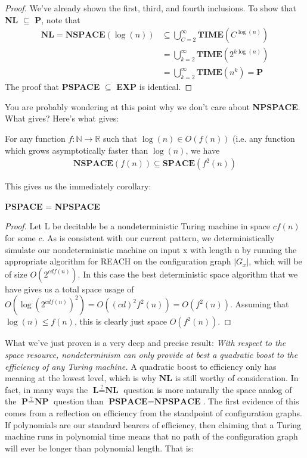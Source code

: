 \begin{proof}
We've already shown the first, third, and fourth inclusions. To show that \textbf{NL} $\subseteq$ \textbf{P}, note that
\begin{align}
	\textbf{NL} = \textbf{NSPACE}(\log(n)) &\subseteq \bigcup_{C=2}^{\infty}\textbf{TIME}(C^{\log(n)}) \\
	&= \bigcup_{k=2}^{\infty}\textbf{TIME}(2^{k\log(n)}) \\
	&= \bigcup_{k=2}^{\infty}\textbf{TIME}(n^k) = \textbf{P}
\end{align}  
The proof that \textbf{PSPACE} $\subseteq$ \textbf{EXP} is identical.  
\end{proof}
You are probably wondering at this point why we don't care about \textbf{NPSPACE}. What gives? Here's what gives:
\begin{theorem} For any function $f:\mathbb{N} \to \mathbb{R}$ such that $\log(n) \in O(f(n))$ (i.e. any function which grows asymptotically faster than $\log(n)$, we have
\begin{align}
    \textbf{NSPACE$(f(n))$} \subseteq \textbf{SPACE$(f^2(n))$}
\end{align}
\end{theorem}
This gives us the immediately corollary:
\begin{corollary}
\textbf{PSPACE} = \textbf{NPSPACE} 
\end{corollary}
\begin{proof}
Let L be decitable be a nondeterministic Turing machine in space $cf(n)$ for some $c$. As is consistent with our current pattern, we deterministically simulate our nondeterministic machine on input x with length n by running the appropriate algorithm for REACH on the configuration graph $|G_x|$, which will be of size $O(2^{cdf(n)})$. In this case the best deterministic space algorithm that we have gives us a total space usage of $O(\log(2^{cdf(n)})^2)=O((cd)^2f^2(n)) = O(f^2(n))$. Assuming that $\log(n) \leq f(n)$, this is clearly just space $O(f^2(n))$. 
\end{proof}
What we've just proven is a very deep and precise result: \textit{With respect to the space resource, nondeterminism can only provide at best a quadratic boost to the efficiency of any Turing machine.} A quadratic boost to efficiency only has meaning at the lowest level, which is why $\textbf{NL}$ is still worthy of consideration. In fact, in many ways the $\textbf{L} \overset{?}{=} \textbf{NL}$ question is more naturally the space analog of the $\textbf{P} \overset{?}{=} \textbf{NP}$ question than $\textbf{PSPACE} = \textbf{NPSPACE}$. The first evidence of this comes from a reflection on efficiency from the standpoint of configuration graphs. If polynomials are our standard bearers of efficiency, then claiming that a Turing machine runs in polynomial time means that no path of the configuration graph will ever be longer than polynomial length. That is:

